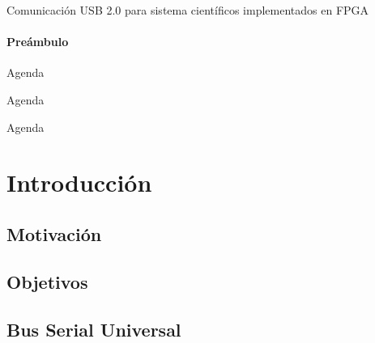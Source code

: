 \documentclass[11pt,a4paper]{beamer}
\begin{document}
	\titlepage
	\begin{frame}[c]{Comunicación USB 2.0 para sistema científicos implementados en FPGA}
		\framesubtitle{Preámbulo}
	\end{frame}
	\begin{frame}{Agenda}
		\tableofcontents[hideallsubsections]
	\end{frame}
	\begin{frame}{Agenda}
		\tableofcontents[sections={1,2}]
	\end{frame}
	\begin{frame}{Agenda}
		\tableofcontents[sections={3,4}]
	\end{frame}
	\section{Introducción}{
		\subsection{Motivación}
			
		\subsection{Objetivos}
			
		\subsection{Bus Serial Universal}
			}
\end{document}
